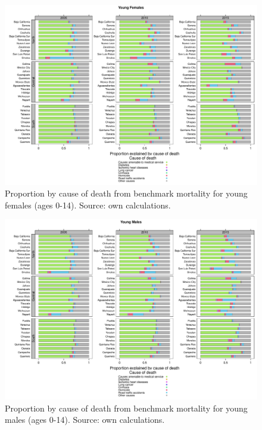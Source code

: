 \documentclass[11.5pt]{article}
\begin{document}
{\begin{figure}
\centering
\caption{Proportion by cause of death from benchmark mortality for young females (ages 0-14). Source: own calculations.}
\begin{center}
\includegraphics[scale=.45]{Figure_prop_yf.pdf}
\end{center}
\end{figure}

\begin{figure}
\centering
\caption{Proportion by cause of death from benchmark mortality for young males (ages 0-14). Source: own calculations.}
\begin{center}
\includegraphics[scale=.45]{Figure_prop_ym.pdf}
\end{center}
\end{figure}



}
\end{document}
